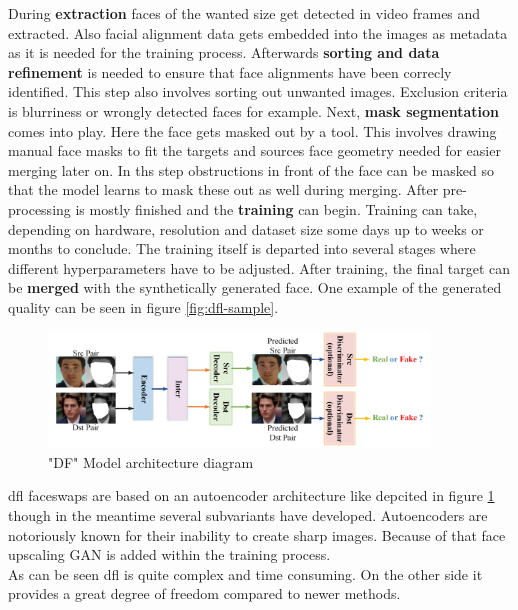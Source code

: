 \documentclass[
  a4paper,  %
  twoside,  %
  bibliography=totoc,
  headsepline,
  cleardoublepage=empty,
  parskip=half,
  draft=false
]{scrbook}
\begin{document}
During \textbf{extraction} faces of the wanted size get detected in video frames and extracted. Also facial alignment data gets embedded into the images as metadata as it is needed for the training process.
Afterwards \textbf{sorting and data refinement} is needed to ensure that face alignments have been correcly identified. This step also involves sorting out unwanted images. Exclusion criteria is blurriness or wrongly detected faces for example. Next, \textbf{mask segmentation} comes into play. Here the face gets masked out by a tool. This involves drawing manual face masks to fit the targets and sources face geometry needed for easier merging later on. In ths step obstructions in front of the face can be masked so that the model learns to mask these out as well during merging. After pre-processing is mostly finished and the \textbf{training} can begin. Training can take, depending on hardware, resolution and dataset size some days up to weeks or months to conclude. The training itself is departed into several stages where different hyperparameters have to be adjusted. After training, the final target can be \textbf{merged} with the synthetically generated face. One example of the generated quality can be seen in figure \ref{fig:dfl-sample}.
\begin{figure}[h]
  \centering
  \includegraphics[width=0.9\textwidth]{./graphics/images/df-model-arch.png}
  \caption{"DF" Model architecture diagram \cite{perovDeepFaceLabIntegratedFlexible2021}}
  \label{fig:df-model-diagram}
\end{figure}

\gls{dfl} faceswaps are based on an autoencoder architecture like depcited in figure \ref{fig:df-model-diagram} though in the meantime several subvariants have developed. Autoencoders are notoriously known for their inability to create sharp images. Because of that face upscaling GAN is added within the training process. \\
As can be seen \gls{dfl} is quite complex and time consuming. On the other side it provides a great degree of freedom compared to newer methods.
\end{document}
